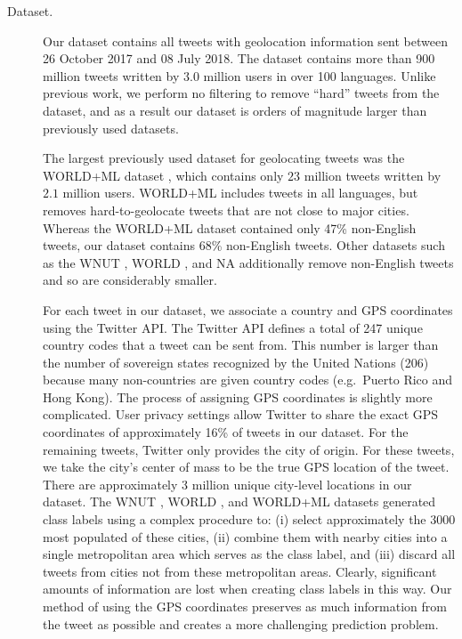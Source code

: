 \documentclass[sigconf,anonymous,review]{acmart}
\renewcommand{\times}{\mathbin{\tikz [x=1.4ex,y=1.4ex,line width=.1ex] \draw (0,0) -- (1,1) (0,1) -- (1,0);}}%
\begin{document}
\begin{description}

\item[Dataset.]
Our dataset contains all tweets with geolocation information sent between 26 October 2017 and 08 July 2018.
The dataset contains more than 900 million tweets written by $3.0$ million users in over 100 languages.
Unlike previous work, 
we perform no filtering to remove ``hard'' tweets from the dataset,
and as a result our dataset is orders of magnitude larger than previously used datasets.

The largest previously used dataset for geolocating tweets was the WORLD+ML dataset \citep{han2014text},
which contains only $23$ million tweets written by $2.1$ million users.
WORLD+ML includes tweets in all languages,
but removes hard-to-geolocate tweets that are not close to major cities.
Whereas the WORLD+ML dataset contained only 47\% non-English tweets,
our dataset contains 68\% non-English tweets.
Other datasets such as the WNUT \citep{han2016twitter}, WORLD \citep{han2012geolocation}, and NA \citep{roller2012supervised}
additionally remove non-English tweets and so are considerably smaller.

For each tweet in our dataset, we associate a country and GPS coordinates using the Twitter API.
The Twitter API defines a total of 247 unique country codes that a tweet can be sent from.
This number is larger than the number of sovereign states recognized by the United Nations (206)
because many non-countries are given country codes (e.g.\ Puerto Rico and Hong Kong).
The process of assigning GPS coordinates is slightly more complicated.
User privacy settings allow Twitter to share the exact GPS coordinates of approximately 16\% of tweets in our dataset.
For the remaining tweets, Twitter only provides the city of origin.
For these tweets, we take the city's center of mass to be the true GPS location of the tweet.
There are approximately 3 million unique city-level locations in our dataset.
The WNUT \citep{han2016twitter}, WORLD \citep{han2012geolocation}, and WORLD+ML \citep{han2014text} datasets generated class labels using a complex procedure to:
(i) select approximately the 3000 most populated of these cities,
(ii) combine them with nearby cities into a single metropolitan area which serves as the class label,
and (iii) discard all tweets from cities not from these metropolitan areas.
Clearly, significant amounts of information are lost when creating class labels in this way.
Our method of using the GPS coordinates preserves as much information from the tweet as possible and creates a more challenging prediction problem.


\end{description}
\end{document}
